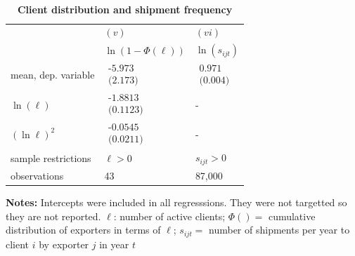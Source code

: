 \documentclass[12pt]{article}
\begin{document}
\begin{table}[tbp]
\caption{\textbf{Client distribution and shipment frequency}}
\label{tab:client_dist}\centering
{\small \ }
\par
{\small 
\begin{tabular}{lll}
\hline\hline
& $(v)$ & $(vi)$ \\ 
& $\ln (1-\Phi (\ell ))$ & $\ln (s_{ijt})$ \\ \hline
mean, dep. variable & $%
\begin{array}{c}
\text{-5.973} \\ 
\text{(2.173)}%
\end{array}%
$ & $%
\begin{array}{c}
\text{0.971 } \\ 
\text{(0.004)}%
\end{array}%
$ \\ \cline{2-3}
$\ln (\ell )$ & $%
\begin{array}{c}
\text{-1.8813 } \\ 
\text{(0.1123)}%
\end{array}%
$ & - \\ 
$(\ln \ell )^{2}$ & $%
\begin{array}{c}
\text{-0.0545 } \\ 
\text{(0.0211)}%
\end{array}%
$ & - \\ \hline
sample restrictions & $\ell >0$ & $s_{ijt}>0$ \\ 
observations & 43 & 87,000 \\ \hline
\end{tabular}
} \endcenter%
\begin{tablenotes}
\item \textbf{Notes:} Intercepts were included in all regresssions. They were not targetted so they are not reported.  $\ell$: number of active clients;  $\Phi ( ) = $ cumulative distribution of exporters in terms of  $\ell$;
$s_{ijt}=$ number of shipments per year to client $i$ by exporter $j$ in year $t$
\end{tablenotes}
\end{table}
\end{document}
